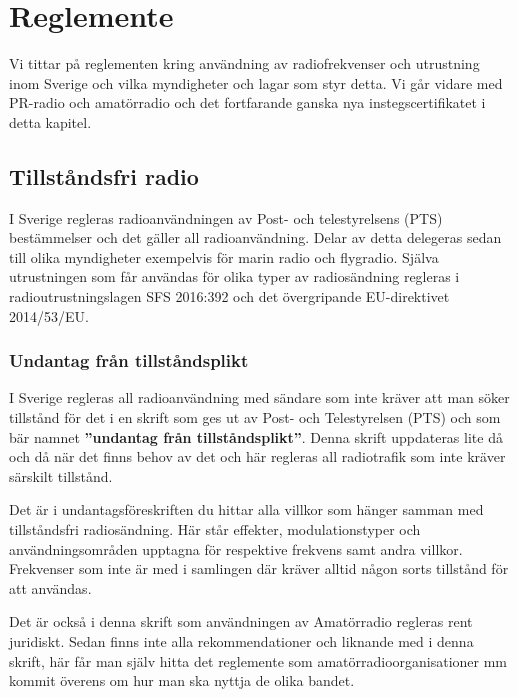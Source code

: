 \chapter{Reglemente}

Vi tittar på reglementen kring användning av radiofrekvenser och utrustning
inom Sverige och vilka myndigheter och lagar som styr detta. Vi går vidare med
PR-radio och amatörradio och det fortfarande ganska nya instegscertifikatet i
detta kapitel.

\vfill \minitoc

\clearpage

\section{Tillståndsfri radio}

I Sverige regleras radioanvändningen av Post- och telestyrelsens (PTS)
bestämmelser och det gäller all radioanvändning. Delar av detta delegeras
sedan till olika myndigheter exempelvis för marin radio och flygradio. Själva
utrustningen som får användas för olika typer av radiosändning regleras i
radioutrustningslagen SFS 2016:392 och det övergripande EU-direktivet
2014/53/EU.

\subsection{Undantag från tillståndsplikt}
\label{sec:undantag}

I Sverige regleras all radioanvändning med sändare som inte kräver att man
söker tillstånd för det i en skrift som ges ut av Post- och Telestyrelsen
(PTS) och som bär namnet {\bf ''undantag från tillståndsplikt''}. Denna skrift
uppdateras lite då och då när det finns behov av det och här regleras all
radiotrafik som inte kräver särskilt tillstånd.

Det är i undantagsföreskriften du hittar alla villkor som hänger samman med
tillståndsfri radio\-sänd\-ning. Här står effekter, modulationstyper och
användningsområden upptagna för respektive frekvens samt andra
villkor. Frekvenser som inte är med i samlingen där kräver alltid någon sorts
tillstånd för att användas.

Det är också i denna skrift som användningen av Amatörradio regleras rent
juridiskt. Sedan finns inte alla rekommendationer och liknande med i denna
skrift, här får man själv hitta det reglemente som amatörradioorganisationer
mm kommit överens om hur man ska nyttja de olika bandet.

